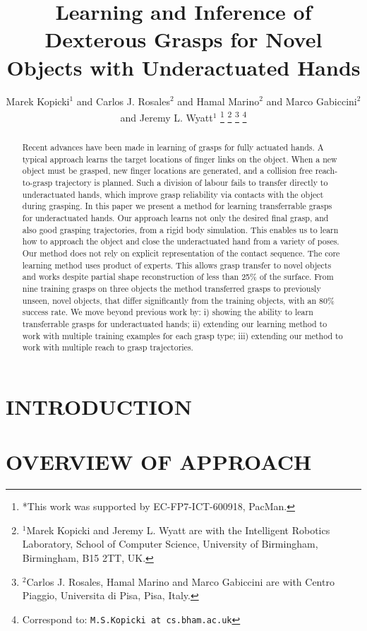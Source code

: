 \documentclass[a4paper, 10pt, conference]{ieeeconf}
\title{\LARGE \bf
Learning and Inference of Dexterous Grasps for Novel Objects with Underactuated Hands
}
\author{Marek Kopicki$^{1}$ and Carlos J. Rosales$^{2}$ and Hamal Marino$^{2}$ and Marco Gabiccini$^{2}$ and Jeremy L. Wyatt$^{1}$%
\thanks{*This work was supported by EC-FP7-ICT-600918, PacMan.}%
\thanks{$^{1}$Marek Kopicki and Jeremy L. Wyatt are with the Intelligent Robotics Laboratory, School of Computer Science,
        University of Birmingham, Birmingham, B15 2TT, UK.}
\thanks{$^{2}$Carlos J. Rosales, Hamal Marino and Marco Gabiccini are with Centro Piaggio, Universita di Pisa, Pisa, Italy.}
\thanks{Correspond to: {\tt\small M.S.Kopicki at cs.bham.ac.uk}}%
}
\begin{document}
\maketitle
\thispagestyle{empty}
\pagestyle{empty}


\begin{abstract}
Recent advances have been made in learning of grasps for fully actuated hands. A typical approach learns the target locations of finger links on the object. When a new object must be grasped, new finger locations are generated, and a collision free reach-to-grasp trajectory is planned. Such a division of labour fails to transfer directly to underactuated hands, which improve grasp reliability via contacts with the object during grasping. In this paper we present a method for learning transferrable grasps for underactuated hands. Our approach learns not only the desired final grasp, and also good grasping trajectories, from a rigid body simulation. This enables us to learn how to approach the object and close the underactuated hand from a variety of poses. Our method does not rely on explicit representation of the contact sequence. The core learning method uses product of experts. This allows grasp transfer to novel objects and works despite partial shape reconstruction of less than 25\% of the surface. From nine training grasps on three objects the method transferred grasps to previously unseen, novel objects, that differ significantly from the training objects, with an 80\% success rate. We move beyond previous work by: i) showing the ability to learn transferrable grasps for underactuated hands; ii) extending our learning method to work with multiple training examples for each grasp type; iii) extending our method to work with multiple reach to grasp trajectories.
\end{abstract}


\section{INTRODUCTION}
\label{sec:introduction}



\section{OVERVIEW OF APPROACH}
\label{sec:overview}

\end{document}
